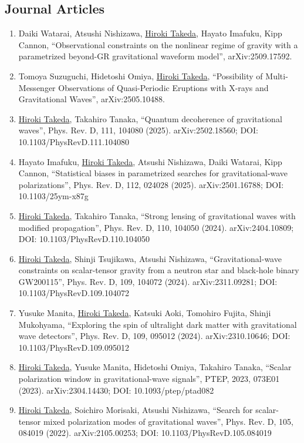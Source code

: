 \documentclass[uplatex, 12pt]{article}
\begin{document}
\subsection*{Journal Articles}
\begin{enumerate}
\item Daiki Watarai, Atsushi Nishizawa, \uline{Hiroki Takeda}, Hayato Imafuku, Kipp Cannon, “Observational constraints on the nonlinear regime of gravity with a parametrized beyond-GR gravitational waveform model”, arXiv:2509.17592.
\item Tomoya Suzuguchi, Hidetoshi Omiya, \uline{Hiroki Takeda}, “Possibility of Multi-Messenger Observations of Quasi-Periodic Eruptions with X-rays and Gravitational Waves”, arXiv:2505.10488.
\item \uline{Hiroki Takeda}, Takahiro Tanaka, “Quantum decoherence of gravitational waves”, Phys. Rev. D, 111, 104080 (2025). arXiv:2502.18560; DOI: 10.1103/PhysRevD.111.104080
\item Hayato Imafuku, \uline{Hiroki Takeda}, Atsushi Nishizawa, Daiki Watarai, Kipp Cannon, “Statistical biases in parametrized searches for gravitational-wave polarizations”, Phys. Rev. D, 112, 024028 (2025). arXiv:2501.16788; DOI: 10.1103/25ym-x87g
\item \uline{Hiroki Takeda}, Takahiro Tanaka, “Strong lensing of gravitational waves with modified propagation”, Phys. Rev. D, 110, 104050 (2024). arXiv:2404.10809; DOI: 10.1103/PhysRevD.110.104050
\item \uline{Hiroki Takeda}, Shinji Tsujikawa, Atsushi Nishizawa, “Gravitational-wave constraints on scalar-tensor gravity from a neutron star and black-hole binary GW200115”, Phys. Rev. D, 109, 104072 (2024). arXiv:2311.09281; DOI: 10.1103/PhysRevD.109.104072
\item Yusuke Manita, \uline{Hiroki Takeda}, Katsuki Aoki, Tomohiro Fujita, Shinji Mukohyama, “Exploring the spin of ultralight dark matter with gravitational wave detectors”, Phys. Rev. D, 109, 095012 (2024). arXiv:2310.10646; DOI: 10.1103/PhysRevD.109.095012
\item \uline{Hiroki Takeda}, Yusuke Manita, Hidetoshi Omiya, Takahiro Tanaka, “Scalar polarization window in gravitational-wave signals”, PTEP, 2023, 073E01 (2023). arXiv:2304.14430; DOI: 10.1093/ptep/ptad082
\item \uline{Hiroki Takeda}, Soichiro Morisaki, Atsushi Nishizawa, “Search for scalar-tensor mixed polarization modes of gravitational waves”, Phys. Rev. D, 105, 084019 (2022). arXiv:2105.00253; DOI: 10.1103/PhysRevD.105.084019

\end{enumerate}
\end{document}
